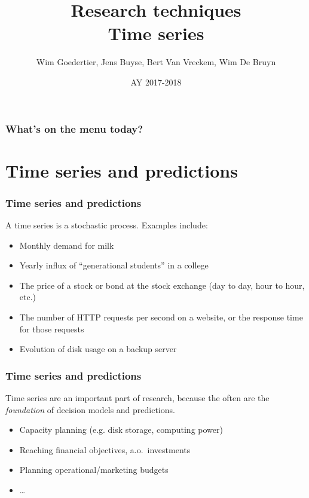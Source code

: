 \documentclass{beamer}
\title[Intro]{Research techniques\\Time series}
\author{Wim Goedertier, Jens Buyse, Bert {Van Vreckem}, Wim {De Bruyn}}
\date{AY 2017-2018}
\begin{document}

\HoGentLogo

\titleframe


\begin{frame}
  \frametitle{What's on the menu today?}

  \tableofcontents
\end{frame}

\section{Time series and predictions}

\begin{frame}
  \frametitle{Time series and predictions}

\vfill
  A time series is a stochastic process. Examples include:

  \begin{itemize}
    \item Monthly demand for milk
    \item Yearly influx of ``generational students'' in a college
    \item The price of a stock or bond at the stock exchange (day to day, hour to hour, etc.)
    \item The number of HTTP requests per second on a website, or the response time for those requests
    \item Evolution of disk usage on a backup server
  \end{itemize}
\end{frame}

\begin{frame}
  \frametitle{Time series and predictions}
  
  Time series are an important part of research, because the often are the \emph{foundation} of decision models and predictions.
  
  \begin{itemize}
    \item Capacity planning (e.g. disk storage, computing power)
    \item Reaching financial objectives, a.o.~investments
    \item Planning operational/marketing budgets
    \item \dots
  \end{itemize}
\end{frame}
\end{document}
